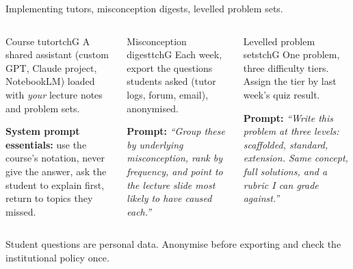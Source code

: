 \documentclass[aspectratio=169, 10pt]{beamer}
\begin{document}
\begin{frame}{Implementing tutors, misconception digests, levelled problem sets.}
\vskip0.1cm
\begin{columns}[t]
\begin{mckcardg}[mcknavy]{Course tutor}{tchG}
\footnotesize
A shared assistant (custom GPT, Claude project, NotebookLM) loaded with \emph{your} lecture notes and problem sets.
\medskip

\textbf{System prompt essentials:} use the course's notation, never give the answer, ask the student to explain first, return to topics they missed.

\end{mckcardg}

\begin{mckcardg}[mckteal]{Misconception digest}{tchG}
\footnotesize
Each week, export the questions students asked (tutor logs, forum, email), anonymised.
\medskip

\textbf{Prompt:} \textit{``Group these by underlying misconception, rank by frequency, and point to the lecture slide most likely to have caused each.''}

\end{mckcardg}

\begin{mckcardg}[mckamber]{Levelled problem sets}{tchG}
\footnotesize
One problem, three difficulty tiers. Assign the tier by last week's quiz result.
\medskip

\textbf{Prompt:} \textit{``Write this problem at three levels: scaffolded, standard, extension. Same concept, full solutions, and a rubric I can grade against.''}
\medskip
\end{mckcardg}
\end{columns}

\vskip0.25cm
\begin{sowhat}
Student questions are personal data. Anonymise before exporting and check the institutional policy once.
\end{sowhat}
\end{frame}

\end{document}
